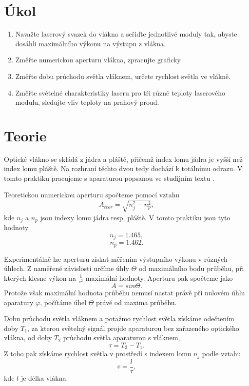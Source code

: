 \documentclass{protokol}
\begin{document}
  \section*{Úkol}

    \begin{enumerate}
      \item Navažte laserový svazek do vlákna a seřiďte jednotlivé moduly tak, abyste dosáhli maximálního výkonu na výstupu z vlákna.
      \item Změřte numerickou aperturu vlákna, zpracujte graficky.
      \item Změřte dobu průchodu světla vláknem, určete rychlost světla ve vlákně.
      \item Změřte světelné charakteristiky laseru pro tři různé teploty laserového modulu, sledujte vliv teploty na prahový proud.
    \end{enumerate}

  \section*{Teorie}

    Optické vlákno se skládá z jádra a pláště, přičemž index lomu jádra je vyšší než index lomu pláště. Na rozhraní těchto dvou tedy dochází k totálnímu odrazu.
    V tomto praktiku pracujeme s aparaturou popsanou ve studijním textu \cite{pokyny}.

    Teoretickou numerickou aperturu spočteme pomocí vztahu 
    \begin{equation} \label{eq:teor_apertura}
      A_{teor} = \sqrt{n_j^2 - n_p^2},
    \end{equation}
    kde $n_j$ a $n_p$ jsou indexy lomu jádra resp. pláště. V tomto praktiku jsou tyto hodnoty
    $$ n_j = \num{1.465}, $$
    $$ n_p = \num{1.462}. $$

    Experimentálně lze aperturu získat měřením výstupního výkonu v různých úhlech. Z naměřené závislosti určíme úhly $\Theta$ od maximálního bodu průběhu, při kterých klesne výkon na $\frac{1}{e^2}$ maximální hodnoty. Aperturu pak spočteme jako 
    \begin{equation}
      A = sin \Theta.
    \end{equation}
    Protože však maximální hodnota průběhu nemusí nastat právě při nulovém úhlu aparatury $\varphi$, počítáme úhel $\Theta$ právě od maxima průběhu.

    Dobu průchodu světla vláknem a potažmo rychlost světla získáme odečtením doby $T_1$, za kterou světelný signál projde aparaturou bez zařazeného optického vlákna, od doby $T_2$ průchodu světla aparaturou s vláknem,
    \begin{equation}
      \tau = T_2 - T_1.
    \end{equation}
    Z toho pak získáme rychlost světla v prostředí s indexem lomu $n_j$ podle vztahu 
    \begin{equation}
      v = \frac{l}{\tau},
    \end{equation}
    kde $l$ je délka vlákna.
\end{document}
